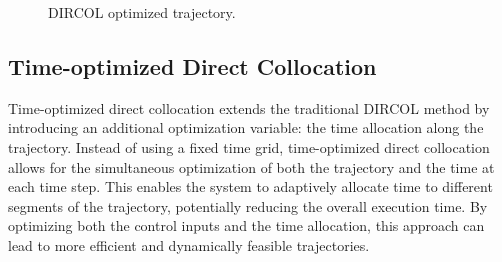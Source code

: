 \documentclass[conference]{IEEEtran}
\begin{document}
\begin{figure}[!ht]
    \centering
    \hspace{0mm}
    \caption{DIRCOL optimized trajectory.}
    \label{fig:dircol}
\end{figure}

\subsection{Time-optimized Direct Collocation}
Time-optimized direct collocation extends the traditional DIRCOL method by introducing an additional optimization variable: the time allocation along the trajectory. Instead of using a fixed time grid, time-optimized direct collocation allows for the simultaneous optimization of both the trajectory and the time at each time step. This enables the system to adaptively allocate time to different segments of the trajectory, potentially reducing the overall execution time. By optimizing both the control inputs and the time allocation, this approach can lead to more efficient and dynamically feasible trajectories.
\end{document}
